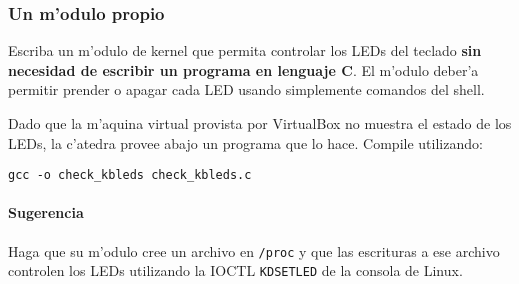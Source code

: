 \subsubsection{Un m'odulo propio}

Escriba un m'odulo de kernel que permita controlar los LEDs del teclado \textbf{sin necesidad de escribir un programa 
en lenguaje C}. El m'odulo deber'a permitir prender o apagar cada LED usando simplemente comandos del shell.

Dado que la m'aquina virtual provista por VirtualBox no muestra el estado de los LEDs, la c'atedra provee abajo
un programa que lo hace. Compile utilizando:

\texttt{gcc -o check\_kbleds check\_kbleds.c}


\paragraph{Sugerencia}

Haga que su m'odulo cree un archivo en \texttt{/proc} y que las escrituras a ese archivo controlen los LEDs utilizando 
la IOCTL \texttt{KDSETLED} de la consola de Linux.

